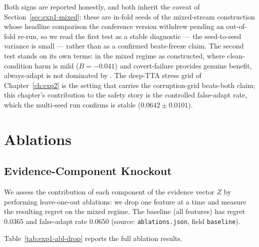 Both signs are reported honestly, and both inherit the caveat of
Section~\ref{sec:exp1-mixed}: these are in-fold seeds of the mixed-stream construction
whose headline comparison the conference version withdrew pending an out-of-fold re-run,
so we read the first test as a stable diagnostic --- the seed-to-seed variance is small
--- rather than as a confirmed beats-freeze claim.  The second test stands on its own
terms: in the mixed regime as constructed, where clean-condition harm is mild
($B = -0.041$) and covert-failure provides genuine benefit, always-adapt is not dominated
by \KGA.  The deep-TTA stress grid of Chapter~\ref{ch:exp2} is the setting that carries
the corruption-grid beats-both claim; this chapter's contribution to the safety story is
the controlled false-adapt rate, which the multi-seed run confirms is stable
($0.0642 \pm 0.0101$).

\section{Ablations}
\label{sec:exp1-ablations}

\subsection{Evidence-Component Knockout}

We assess the contribution of each component of the evidence vector $Z$ by performing
leave-one-out ablations: we drop one feature at a time and measure the resulting regret
on the mixed regime.  The baseline (all features) has regret $0.0365$ and false-adapt
rate $0.0650$ (source: \texttt{ablations.json}, field \texttt{baseline}).

Table~\ref{tab:exp1-abl-drop} reports the full ablation results.

